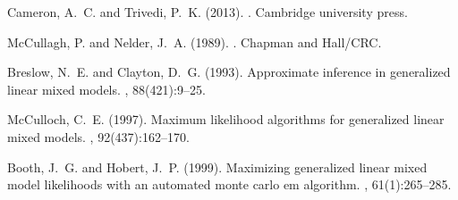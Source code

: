 \documentclass[11pt]{article}
\begin{document}

\begin{thebibliography}{}

Cameron, A.~C. and Trivedi, P.~K. (2013).
.
\newblock Cambridge university press.

McCullagh, P. and Nelder, J.~A. (1989).
.
\newblock Chapman and Hall/CRC.

Breslow, N.~E. and Clayton, D.~G. (1993).
\newblock Approximate inference in generalized linear mixed models.
, 88(421):9--25.

McCulloch, C.~E. (1997).
\newblock Maximum likelihood algorithms for generalized linear mixed models.
, 92(437):162--170.

Booth, J.~G. and Hobert, J.~P. (1999).
\newblock Maximizing generalized linear mixed model likelihoods with an automated monte carlo em algorithm.
, 61(1):265--285.

\end{thebibliography}
\end{document}
